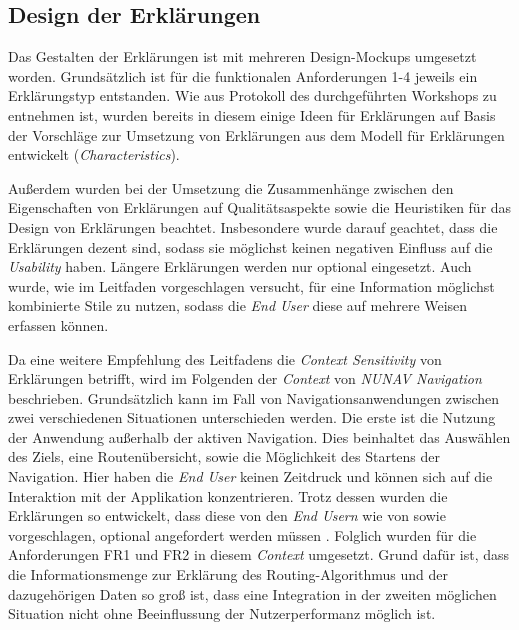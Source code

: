 \subsection{Design der Erklärungen}
\label{sec:explanation_design}

Das Gestalten der Erklärungen ist mit mehreren Design-Mockups umgesetzt worden. Grundsätzlich ist für die funktionalen Anforderungen 1-4 jeweils ein Erklärungstyp entstanden. Wie aus Protokoll des durchgeführten Workshops zu entnehmen ist, wurden bereits in diesem einige Ideen für Erklärungen auf Basis der Vorschläge zur Umsetzung von Erklärungen aus dem Modell für Erklärungen entwickelt (\textit{Characteristics}).

Außerdem wurden bei der Umsetzung die Zusammenhänge zwischen den Eigenschaften von Erklärungen auf Qualitätsaspekte sowie die Heuristiken für das Design von Erklärungen beachtet. Insbesondere wurde darauf geachtet, dass die Erklärungen dezent sind, sodass sie möglichst keinen negativen Einfluss auf die \textit{Usability} haben. Längere Erklärungen werden nur optional eingesetzt. Auch wurde, wie im Leitfaden vorgeschlagen versucht, für eine Information möglichst kombinierte Stile zu nutzen, sodass die \textit{End User} diese auf mehrere Weisen erfassen können.

Da eine weitere Empfehlung des Leitfadens die \textit{Context Sensitivity} von Erklärungen betrifft, wird im Folgenden der \textit{Context} von \textit{NUNAV Navigation} beschrieben.
Grundsätzlich kann im Fall von Navigationsanwendungen zwischen zwei verschiedenen Situationen unterschieden werden. Die erste ist die Nutzung der Anwendung außerhalb der aktiven Navigation. Dies beinhaltet das Auswählen des Ziels, eine Routenübersicht, sowie die Möglichkeit des Startens der Navigation. Hier haben die \textit{End User} keinen Zeitdruck und können sich auf die Interaktion mit der Applikation konzentrieren. Trotz dessen wurden die Erklärungen so entwickelt, dass diese von den \textit{End Usern} wie von \citeauthor{chazette_end-users_nodate} sowie \citeauthor{wang_integration_2020} vorgeschlagen, optional angefordert werden müssen \cite{chazette_end-users_nodate,wang_integration_2020}. Folglich wurden für die Anforderungen FR1 und FR2 in diesem \textit{Context} umgesetzt. Grund dafür ist, dass die Informationsmenge zur Erklärung des Routing-Algorithmus und der dazugehörigen Daten so groß ist, dass eine Integration in der zweiten möglichen Situation nicht ohne Beeinflussung der Nutzerperformanz möglich ist.

